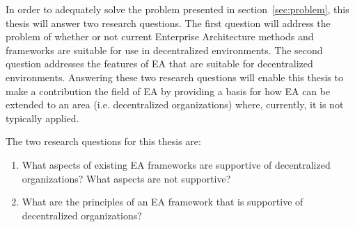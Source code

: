 In order to adequately solve the problem presented in section~\ref{sec:problem}, this thesis will answer two research questions. The first question will address the problem of whether or not current Enterprise Architecture methods and frameworks are suitable for use in decentralized environments. The second question addresses the features of EA that are suitable for decentralized environments. Answering these two research questions will enable this thesis to make a contribution the field of EA by providing a basis for how EA can be extended to an area (i.e. decentralized organizations) where, currently, it is not typically applied. 

The two research questions for this thesis are:

\begin{enumerate}
\item What aspects of existing EA frameworks are supportive of decentralized organizations? What aspects are not supportive?
\label{req:1}
\item What are the principles of an EA framework that is supportive of decentralized organizations?
\label{req:2}
\end{enumerate}

